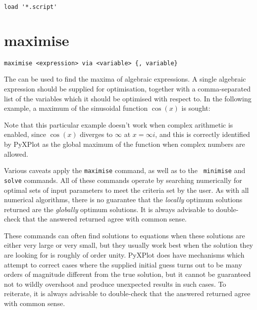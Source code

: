\begin{verbatim}
load '*.script'
\end{verbatim}


\section{maximise}

\begin{verbatim}
maximise <expression> via <variable> {, variable}
\end{verbatim}

The  can be used to find the maxima of algebraic expressions.
A single algebraic expression should be supplied for optimisation, together
with a comma-separated list of the variables which it should be optimised with
respect to. In the following example, a maximum of the sinusoidal function
$\cos(x)$ is sought:

\vspace{3mm}
\newline
{}\newline
{}\newline
{}\newline
{}
\vspace{3mm}

\noindent Note that this particular example doesn't work when complex
arithmetic is enabled, since $\cos(x)$ diverges to $\infty$ at $x=\infty
i$, and this is correctly identified by PyXPlot as the global maximum of the
function when complex numbers are allowed.

Various caveats apply the {\tt maximise} command, as well as to the {\tt
minimise} and {\tt solve} commands.  All of these commands operate by searching
numerically for optimal sets of input parameters to meet the criteria set by
the user. As with all numerical algorithms, there is no guarantee that the {\it
locally} optimum solutions returned are the {\it globally} optimum solutions.
It is always advisable to double-check that the answered returned agree with
common sense.

These commands can often find solutions to equations when these solutions are
either very large or very small, but they usually work best when the solution
they are looking for is roughly of order unity.  PyXPlot does have mechanisms
which attempt to correct cases where the supplied initial guess turns out to be
many orders of magnitude different from the true solution, but it cannot be
guaranteed not to wildly overshoot and produce unexpected results in such
cases.  To reiterate, it is always advisable to double-check that the answered
returned agree with common sense.


